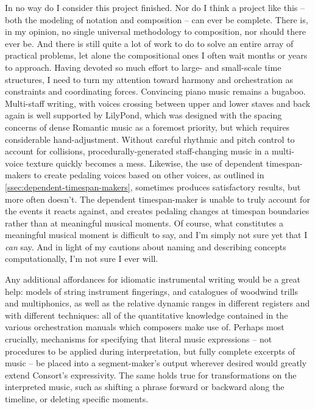 In no way do I consider this project finished. Nor do I think a project like
this -- both the modeling of notation and composition -- can ever be complete.
There is, in my opinion, no single universal methodology to composition, nor
should there ever be. And there is still quite a lot of work to do to solve an
entire array of practical problems, let alone the compositional ones I often
wait months or years to approach. Having devoted so much effort to large- and
small-scale time structures, I need to turn my attention toward harmony and
orchestration as constraints and coordinating forces. Convincing piano music
remains a bugaboo. Multi-staff writing, with voices crossing between upper and
lower staves and back again is well supported by LilyPond, which was designed
with the spacing concerns of dense Romantic music as a foremost priority, but
which requires considerable hand-adjustment. Without careful rhythmic and pitch
control to account for collisions, procedurally-generated staff-changing music
in a multi-voice texture quickly becomes a mess. Likewise, the use of dependent
timespan-makers to create pedaling voices based on other voices, as outlined in
\autoref{ssec:dependent-timespan-makers}, sometimes produces satisfactory
results, but more often doesn't. The dependent timespan-maker is unable to
truly account for the events it reacts against, and creates pedaling changes at
timespan boundaries rather than at meaningful musical moments. Of course, what
constitutes a meaningful musical moment is difficult to say, and I'm simply not
sure yet that I \emph{can} say. And in light of my cautions about naming and
describing concepts computationally, I'm not sure I ever will.

Any additional affordances for idiomatic instrumental writing would be a great
help: models of string instrument fingerings, and catalogues of woodwind trills
and multiphonics, as well as the relative dynamic ranges in different registers
and with different techniques: all of the quantitative knowledge contained in
the various orchestration manuals which composers make use of. Perhaps most
crucially, mechanisms for specifying that literal music expressions -- not
procedures to be applied during interpretation, but fully complete excerpts of
music -- be placed into a segment-maker's output wherever desired would greatly
extend Consort's expressivity. The same holds true for transformations on the
interpreted music, such as shifting a phrase forward or backward along the
timeline, or deleting specific moments.

